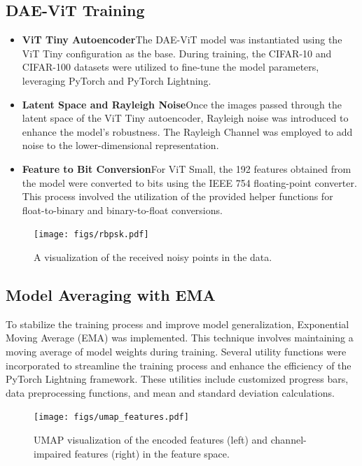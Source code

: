 \documentclass[10pt,twocolumn]{IEEEtran}
\begin{document}
\subsection{DAE-ViT Training}
\begin{itemize}
    \item \textbf{ViT Tiny Autoencoder}The DAE-ViT model was instantiated using the ViT Tiny configuration as the base. During training, the CIFAR-10 and CIFAR-100 datasets were utilized to fine-tune the model parameters, leveraging PyTorch and PyTorch Lightning.
    \item \textbf{ Latent Space and Rayleigh Noise}Once the images passed through the latent space of the ViT Tiny autoencoder, Rayleigh noise was introduced to enhance the model's robustness. The Rayleigh Channel was employed to add noise to the lower-dimensional representation.
    \item \textbf{ Feature to Bit Conversion}For ViT Small, the 192 features obtained from the model were converted to bits using the IEEE 754 floating-point converter. This process involved the utilization of the provided helper functions for float-to-binary and binary-to-float conversions.
\end{itemize}

\begin{figure}[t!]
    \centering
    \texttt{[image: figs/rbpsk.pdf]}
    \caption{A visualization of the received noisy points in the data.}
    \label{fig:Noisy}
\end{figure}

\subsection{Model Averaging with EMA}
To stabilize the training process and improve model generalization, Exponential Moving Average (EMA) was implemented. This technique involves maintaining a moving average of model weights during training. Several utility functions were incorporated to streamline the training process and enhance the efficiency of the PyTorch Lightning framework. These utilities include customized progress bars, data preprocessing functions, and mean and standard deviation calculations.

\begin{figure}[b!]
    \centering
    \texttt{[image: figs/umap\_features.pdf]}
    \caption{UMAP visualization of the encoded features (left) and channel-impaired features (right) in the feature space.}
    \label{fig:features}
\end{figure}
\end{document}
